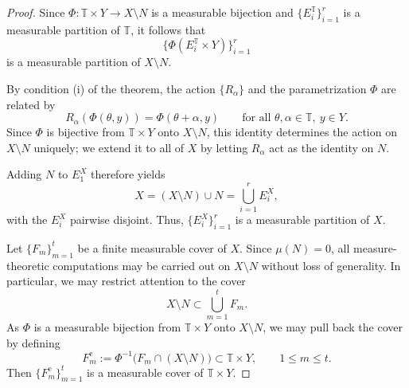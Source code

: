 \documentclass[11pt]{article}
\numberwithin{equation}{section}
\theoremstyle{remark}
\begin{document}
\begin{proof}


Since $\Phi : \mathbb{T}\times Y \to X\setminus N$ is a measurable bijection and $\{E_i^\mathbb{T}\}_{i=1}^r$ is a measurable partition of $\mathbb{T}$, it follows that
\[
\{\Phi(E_i^\mathbb{T}\times Y)\}_{i=1}^r
\]
is a measurable partition of $X\setminus N$. 

By condition (i) of the theorem, the action $\{R_\alpha\}$ and the
parametrization $\Phi$ are related by
\[
    R_\alpha(\Phi(\theta,y)) = \Phi(\theta+\alpha,y)
    \qquad\text{for all }\theta,\alpha\in \mathbb{T},\ y\in Y.
\]
Since $\Phi$ is bijective from $\mathbb{T}\times Y$ onto $X\setminus N$, this identity determines the action on $X\setminus N$ uniquely; we extend it to all of $X$ by letting $R_\alpha$ act as the identity on $N$.

Adding $N$ to $E_1^X$ therefore yields
\[
X = (X\setminus N)\cup N = \bigcup_{i=1}^r E_i^X,
\]
with the $E_i^X$ pairwise disjoint.  
Thus, $\{E_i^X\}_{i=1}^r$ is a measurable partition of $X$.

Let $\{F_m\}_{m=1}^t$ be a finite measurable cover of $X$.
Since $\mu(N)=0$, all measure-theoretic computations may be carried out on $X\setminus N$ without loss of generality. In particular, we may restrict attention to the cover
\[
X\setminus N \subset \bigcup_{m=1}^t F_m.
\]
As $\Phi$ is a measurable bijection from $\mathbb{T}\times Y$ onto $X\setminus N$, we may pull back the cover by defining
\[
F_m^{\mathrm e}
   := \Phi^{-1}\bigl(F_m\cap (X\setminus N)\bigr)
   \subset \mathbb{T}\times Y, \qquad 1\le m\le t.
\]
Then $\{F_m^{\mathrm e}\}_{m=1}^t$ is a measurable cover of $\mathbb{T}\times Y$.


\end{proof}
\end{document}

